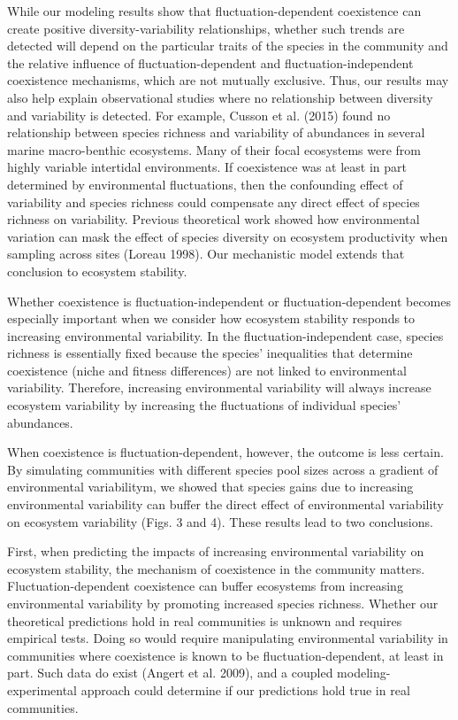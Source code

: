 \documentclass[12pt,]{article}
\begin{document}
While our modeling results show that fluctuation-dependent coexistence
can create positive diversity-variability relationships, whether such
trends are detected will depend on the particular traits of the species
in the community and the relative influence of fluctuation-dependent and
fluctuation-independent coexistence mechanisms, which are not mutually
exclusive. Thus, our results may also help explain observational studies
where no relationship between diversity and variability is detected. For
example, Cusson et al. (2015) found no relationship between species
richness and variability of abundances in several marine macro-benthic
ecosystems. Many of their focal ecosystems were from highly variable
intertidal environments. If coexistence was at least in part determined
by environmental fluctuations, then the confounding effect of
variability and species richness could compensate any direct effect of
species richness on variability. Previous theoretical work showed how
environmental variation can mask the effect of species diversity on
ecosystem productivity when sampling across sites (Loreau 1998). Our
mechanistic model extends that conclusion to ecosystem stability.

Whether coexistence is fluctuation-independent or fluctuation-dependent
becomes especially important when we consider how ecosystem stability
responds to increasing environmental variability. In the
fluctuation-independent case, species richness is essentially fixed
because the species' inequalities that determine coexistence (niche and
fitness differences) are not linked to environmental variability.
Therefore, increasing environmental variability will always increase
ecosystem variability by increasing the fluctuations of individual
species' abundances.

When coexistence is fluctuation-dependent, however, the outcome is less
certain. By simulating communities with different species pool sizes
across a gradient of environmental variabilitym, we showed that species
gains due to increasing environmental variability can buffer the direct
effect of environmental variability on ecosystem variability (Figs. 3
and 4). These results lead to two conclusions.

First, when predicting the impacts of increasing environmental
variability on ecosystem stability, the mechanism of coexistence in the
community matters. Fluctuation-dependent coexistence can buffer
ecosystems from increasing environmental variability by promoting
increased species richness. Whether our theoretical predictions hold in
real communities is unknown and requires empirical tests. Doing so would
require manipulating environmental variability in communities where
coexistence is known to be fluctuation-dependent, at least in part. Such
data do exist (Angert et al. 2009), and a coupled modeling-experimental
approach could determine if our predictions hold true in real
communities.
\end{document}
